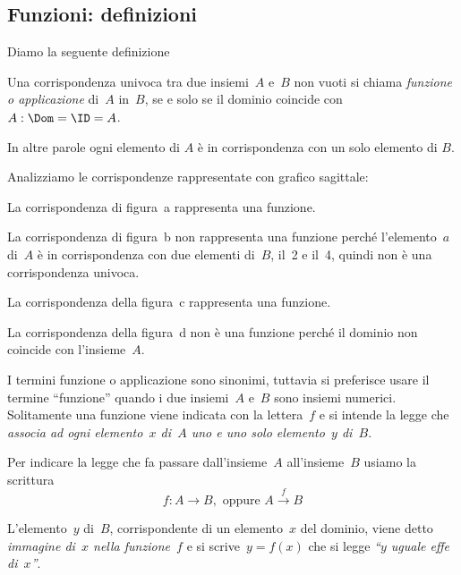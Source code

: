 \subsection{Funzioni: definizioni}
\label{subsec:fun_definizioni}

Diamo la seguente definizione

\begin{definizione}
 Una corrispondenza univoca tra due insiemi~\(A\) e~\(B\) non vuoti
si chiama \emph{funzione o applicazione} di~\(A\) in~\(B\), se e solo se il dominio 
coincide con~\(A: \Dom = \ID = A\).
\end{definizione}
In altre parole ogni elemento di \(A\) è in corrispondenza con un solo elemento di 
\(B\).
\begin{exrig}
 \begin{esempio}
\label{ex:D.1}
Analizziamo le corrispondenze rappresentate con grafico sagittale:
 \begin{center}
  
 \end{center}

La corrispondenza di figura~a rappresenta una funzione.

La corrispondenza di figura~b non rappresenta una funzione perché
l'elemento~\(a\) di~\(A\) è in corrispondenza con due
elementi di~\(B\), il~2 e il~4, quindi non è una corrispondenza univoca.

La corrispondenza della figura~c rappresenta una funzione.

La corrispondenza della figura~d non è una funzione perché il
dominio non coincide con l'insieme~\(A\).
 \end{esempio}

\end{exrig}

I termini funzione o applicazione sono sinonimi, tuttavia si preferisce
usare il termine ``funzione'' quando i due insiemi~\(A\) e~\(B\) sono insiemi 
numerici. Solitamente una funzione
viene indicata con la lettera~\(f\) e si intende la legge
che \emph{associa ad ogni elemento~\(x\) di~\(A\) uno e uno solo elemento~\(y\) 
di~\(B\)}.

Per indicare la legge che fa passare dall'insieme~\(A\) all'insieme~\(B\) usiamo la 
scrittura
\begin{equation*}
f:A \rightarrow B,\text{ oppure } A\overset{{f}}{{\rightarrow }}B
\end{equation*}

\begin{definizione}
 L'elemento~\(y\) di~\(B\), corrispondente di un elemento~\(x\) del dominio, viene 
detto \emph{immagine di~\(x\) nella funzione~\(f\)} e
si scrive~\(y = f(x)\) che si legge \emph{``\(y\) uguale effe di~\(x\)''}.
\end{definizione}


